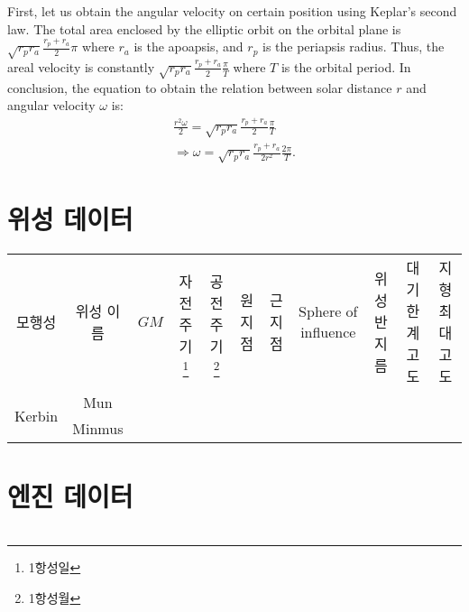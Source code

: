 First, let us obtain the angular velocity on certain position using Keplar's second law.
The total area enclosed by the elliptic orbit on the orbital plane is $\sqrt{r_p r_a}\frac{r_p+r_a}{2}\pi$ where $r_a$ is the apoapsis, and $r_p$ is the periapsis radius. Thus, the areal velocity is constantly $\sqrt{r_p r_a}\frac{r_p+r_a}{2}\frac{\pi}{T}$ where $T$ is the orbital period. In conclusion, the equation to obtain the relation between solar distance $r$ and angular velocity $\omega$ is:
\begin{align}
\frac{r^2 \omega}{2} = \sqrt{r_p r_a}\frac{r_p+r_a}{2}\frac{\pi}{T}
\\\nonumber\Rightarrow \omega = \sqrt{r_p r_a}\frac{r_p+r_a}{2r^2}\frac{2\pi}{T}.
\end{align}



\section{위성 데이터}

\begin{tabular}{|c|c|c|c|c|c|c|c|c|c|c|}
모행성&위성 이름& $GM$& 자전주기\footnote{1항성일}& 공전주기\footnote{1항성월}& 원지점&근지점&Sphere of influence&위성 반지름& 대기한계고도 & 지형 최대고도
\\
\multirow{2}{*}{Kerbin}& Mun
\\&Minmus
\end{tabular}
\section{엔진 데이터}

\begin{tabular}{|l|r|}
\end{tabular}

